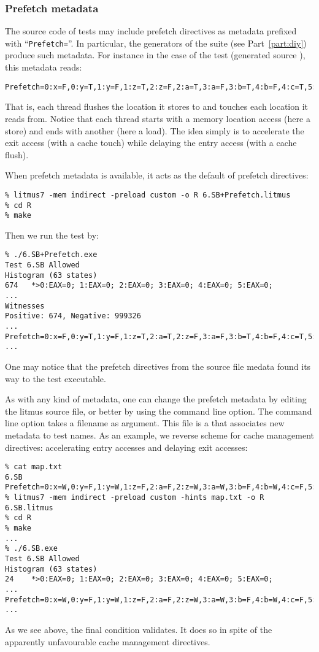 \subsubsection{Prefetch metadata}
The source code of tests may include prefetch directives as metadata
prefixed with ``\verb+Prefetch=+''.
In particular, the generators of the \diy{}
suite  (see Part~\ref{part:diy}) produce such metadata.
For instance in the case of the
 test (generated source ),
this metadata reads:
\begin{verbatim}
Prefetch=0:x=F,0:y=T,1:y=F,1:z=T,2:z=F,2:a=T,3:a=F,3:b=T,4:b=F,4:c=T,5:c=F,5:x=T
\end{verbatim}
That is, each thread flushes the location it stores to and touches
each location it reads from.
Notice that each thread starts with a memory location access
(here a store) and ends with another (here a load).
The idea simply is to accelerate the exit access (with a cache touch)
while delaying the entry access (with a cache flush).


When prefetch metadata is available, it acts as the default of
prefetch directives:
\begin{verbatim}
% litmus7 -mem indirect -preload custom -o R 6.SB+Prefetch.litmus
% cd R
% make
\end{verbatim}
Then we run the test by:
\begin{verbatim}
% ./6.SB+Prefetch.exe
Test 6.SB Allowed
Histogram (63 states)
674   *>0:EAX=0; 1:EAX=0; 2:EAX=0; 3:EAX=0; 4:EAX=0; 5:EAX=0;
...
Witnesses
Positive: 674, Negative: 999326
...
Prefetch=0:x=F,0:y=T,1:y=F,1:z=T,2:a=T,2:z=F,3:a=F,3:b=T,4:b=F,4:c=T,5:c=F,5:x=T
...
\end{verbatim}
One may notice that the prefetch directives from the source file
medata found its way to the test executable.

As with any kind of metadata,
one can change the prefetch metadata by editing the litmus source file,
or better by using the  command line option.
The   command line option takes a filename as  argument.
This file is a  that associates
new metadata to test names.
As an example, we reverse \diy{} scheme for cache management directives:
accelerating entry accesses and delaying exit accesses:
\begin{verbatim}
% cat map.txt
6.SB Prefetch=0:x=W,0:y=F,1:y=W,1:z=F,2:a=F,2:z=W,3:a=W,3:b=F,4:b=W,4:c=F,5:c=W,5:x=F
% litmus7 -mem indirect -preload custom -hints map.txt -o R 6.SB.litmus
% cd R
% make
...
% ./6.SB.exe
Test 6.SB Allowed
Histogram (63 states)
24    *>0:EAX=0; 1:EAX=0; 2:EAX=0; 3:EAX=0; 4:EAX=0; 5:EAX=0;
...
Prefetch=0:x=W,0:y=F,1:y=W,1:z=F,2:a=F,2:z=W,3:a=W,3:b=F,4:b=W,4:c=F,5:c=W,5:x=F
...
\end{verbatim}
As we see above, the final condition validates.
It does so in spite of
the apparently unfavourable cache management directives.

